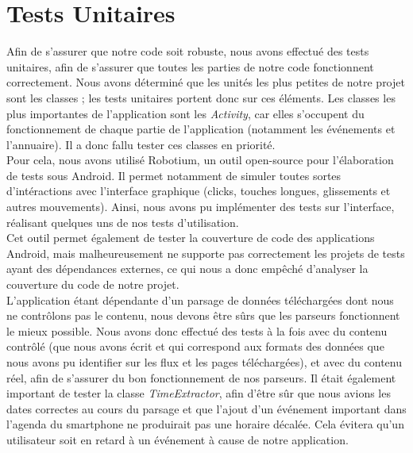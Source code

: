 \section{Tests Unitaires}
Afin de s'assurer que notre code soit robuste, nous avons effectué des tests unitaires, afin de s'assurer que toutes les parties de notre code fonctionnent correctement. Nous avons déterminé que les unités les plus petites de notre projet sont les classes ; les tests unitaires portent donc sur ces éléments. Les classes les plus importantes de l’application sont les \emph{Activity}, car elles s’occupent du fonctionnement de chaque partie de l’application (notamment les événements et l'annuaire). Il a donc fallu tester ces classes en priorité.\\
Pour cela, nous avons utilisé Robotium, un outil open-source pour l'élaboration de tests sous Android. Il permet notamment de simuler toutes sortes d'intéractions avec l'interface graphique (clicks, touches longues, glissements et autres mouvements). Ainsi, nous avons pu implémenter des tests sur l'interface, réalisant quelques uns de nos tests d'utilisation.\\
Cet outil permet également de tester la couverture de code des applications Android, mais malheureusement ne supporte pas correctement les projets de tests ayant des dépendances externes, ce qui nous a donc empêché d'analyser la couverture du code de notre projet.\\

L'application étant dépendante d'un parsage de données téléchargées dont nous ne contrôlons pas le contenu, nous devons être sûrs que les parseurs fonctionnent le mieux possible. Nous avons donc effectué des tests à la fois avec du contenu contrôlé (que nous avons écrit et qui correspond aux formats des données que nous avons pu identifier sur les flux et les pages téléchargées), et avec du contenu réel, afin de s'assurer du bon fonctionnement de nos parseurs.
Il était également important de tester la classe \emph{TimeExtractor}, afin d'être sûr que nous avions les dates correctes au cours du parsage et que l'ajout d'un événement important dans l'agenda du smartphone ne produirait pas une horaire décalée. Cela évitera qu'un utilisateur soit en retard à un événement à cause de notre application.
